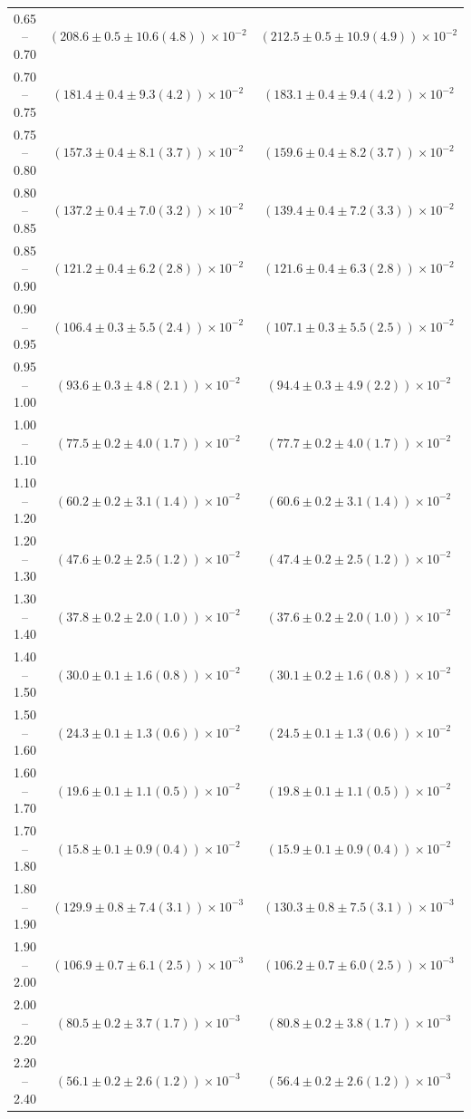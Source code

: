 \begin{table}
\begin{center}
\begin{tabular}{ c | c c }
0.65 -- 0.70 & $(208.6\pm0.5\pm10.6(4.8))\times10^{-2}$ & $(212.5\pm0.5\pm10.9(4.9))\times10^{-2}$ \\ 
0.70 -- 0.75 & $(181.4\pm0.4\pm9.3(4.2))\times10^{-2}$ & $(183.1\pm0.4\pm9.4(4.2))\times10^{-2}$ \\ 
0.75 -- 0.80 & $(157.3\pm0.4\pm8.1(3.7))\times10^{-2}$ & $(159.6\pm0.4\pm8.2(3.7))\times10^{-2}$ \\ 
0.80 -- 0.85 & $(137.2\pm0.4\pm7.0(3.2))\times10^{-2}$ & $(139.4\pm0.4\pm7.2(3.3))\times10^{-2}$ \\ 
0.85 -- 0.90 & $(121.2\pm0.4\pm6.2(2.8))\times10^{-2}$ & $(121.6\pm0.4\pm6.3(2.8))\times10^{-2}$ \\ 
0.90 -- 0.95 & $(106.4\pm0.3\pm5.5(2.4))\times10^{-2}$ & $(107.1\pm0.3\pm5.5(2.5))\times10^{-2}$ \\ 
0.95 -- 1.00 & $(93.6\pm0.3\pm4.8(2.1))\times10^{-2}$ & $(94.4\pm0.3\pm4.9(2.2))\times10^{-2}$ \\ 
1.00 -- 1.10 & $(77.5\pm0.2\pm4.0(1.7))\times10^{-2}$ & $(77.7\pm0.2\pm4.0(1.7))\times10^{-2}$ \\ 
1.10 -- 1.20 & $(60.2\pm0.2\pm3.1(1.4))\times10^{-2}$ & $(60.6\pm0.2\pm3.1(1.4))\times10^{-2}$ \\ 
1.20 -- 1.30 & $(47.6\pm0.2\pm2.5(1.2))\times10^{-2}$ & $(47.4\pm0.2\pm2.5(1.2))\times10^{-2}$ \\ 
1.30 -- 1.40 & $(37.8\pm0.2\pm2.0(1.0))\times10^{-2}$ & $(37.6\pm0.2\pm2.0(1.0))\times10^{-2}$ \\ 
1.40 -- 1.50 & $(30.0\pm0.1\pm1.6(0.8))\times10^{-2}$ & $(30.1\pm0.2\pm1.6(0.8))\times10^{-2}$ \\ 
1.50 -- 1.60 & $(24.3\pm0.1\pm1.3(0.6))\times10^{-2}$ & $(24.5\pm0.1\pm1.3(0.6))\times10^{-2}$ \\ 
1.60 -- 1.70 & $(19.6\pm0.1\pm1.1(0.5))\times10^{-2}$ & $(19.8\pm0.1\pm1.1(0.5))\times10^{-2}$ \\ 
1.70 -- 1.80 & $(15.8\pm0.1\pm0.9(0.4))\times10^{-2}$ & $(15.9\pm0.1\pm0.9(0.4))\times10^{-2}$ \\ 
1.80 -- 1.90 & $(129.9\pm0.8\pm7.4(3.1))\times10^{-3}$ & $(130.3\pm0.8\pm7.5(3.1))\times10^{-3}$ \\ 
1.90 -- 2.00 & $(106.9\pm0.7\pm6.1(2.5))\times10^{-3}$ & $(106.2\pm0.7\pm6.0(2.5))\times10^{-3}$ \\ 
2.00 -- 2.20 & $(80.5\pm0.2\pm3.7(1.7))\times10^{-3}$ & $(80.8\pm0.2\pm3.8(1.7))\times10^{-3}$ \\ 
2.20 -- 2.40 & $(56.1\pm0.2\pm2.6(1.2))\times10^{-3}$ & $(56.4\pm0.2\pm2.6(1.2))\times10^{-3}$ \\ 

\end{tabular}
\end{center}
\end{table}
